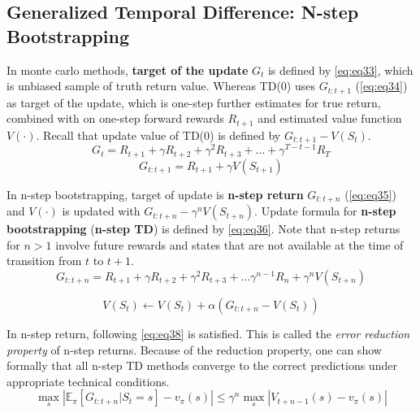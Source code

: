 \documentclass[
	10pt, %
]{article}
\theoremstyle{plain}
\newcommand{\mbb}[1]{\mathbb{#1}}
\newcommand{\tb}[1]{\textbf{#1}}
\newcommand{\ti}[1]{\textit{#1}}
\numberwithin{equation}{subsection} %
\begin{document}
\subsection{Generalized Temporal Difference: N-step Bootstrapping}
In monte carlo methods, \tb{target of the update} $G_t$ is defined by \cref{eq:eq33}, which is unbiased sample of truth return value. Whereas TD(0) uses $G_{t:t+1}$ (\cref{eq:eq34}) as target of the update, which is one-step further estimates for true return, combined with on one-step forward rewards $R_{t+1}$ and estimated value function $V(\cdot)$. Recall that update value of TD(0) is defined by $G_{t:t+1} - V(S_t)$.
\begin{equation} \label{eq:eq33}
    G_t = R_{t+1} + \gamma R_{t+2} + \gamma^2 R_{t+3} + \dots + \gamma^{T-t-1} R_T
\end{equation}
\begin{equation} \label{eq:eq34}
    G_{t:t+1} = R_{t+1} + \gamma V(S_{t+1})
\end{equation}


In n-step bootstrapping, target of update is \tb{n-step return} $G_{t:t+n}$ (\cref{eq:eq35}) and $V(\cdot)$ is updated with $G_{t:t+n} - \gamma^n V(S_{t+n})$. Update formula for \tb{n-step bootstrapping} (\tb{n-step TD}) is defined by \cref{eq:eq36}. Note that n-step returns for $n > 1$ involve future rewards and states that are not available at the time of transition from $t$ to $t+1$.
\begin{equation} \label{eq:eq35}
    G_{t:t+n} = R_{t+1} + \gamma R_{t+2} + \gamma^2 R_{t+3} + \dots \gamma^{n-1} R_{n} + \gamma^n V(S_{t+n})
\end{equation}

\begin{equation} \label{eq:eq36}
    V(S_t) \gets V(S_t) + \alpha\left(G_{t:t+n} - V(S_t)\right)
\end{equation}

In n-step return, following \cref{eq:eq38} is satisfied. This is called the \ti{error reduction property} of n-step returns. Because of the reduction property, one can show formally that all n-step TD methods converge to the correct predictions under appropriate technical conditions.
\begin{equation} \label{eq:eq38}
    \max_s\left|\mbb{E}_\pi [G_{t:t+n}|S_t=s]-v_\pi(s)\right| \leq \gamma^n \max_s\left|V_{t+n-1}(s) - v_\pi(s)\right|
\end{equation}
\end{document}
